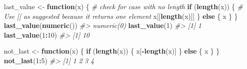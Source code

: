 \documentclass[]{book}
\newenvironment{Shaded}{\begin{snugshade}}{\end{snugshade}}
\newcommand{\CommentTok}[1]{\textcolor[rgb]{0.56,0.35,0.01}{\textit{#1}}}
\newcommand{\ControlFlowTok}[1]{\textcolor[rgb]{0.13,0.29,0.53}{\textbf{#1}}}
\newcommand{\DecValTok}[1]{\textcolor[rgb]{0.00,0.00,0.81}{#1}}
\newcommand{\KeywordTok}[1]{\textcolor[rgb]{0.13,0.29,0.53}{\textbf{#1}}}
\newcommand{\NormalTok}[1]{#1}
\newcommand{\OperatorTok}[1]{\textcolor[rgb]{0.81,0.36,0.00}{\textbf{#1}}}
\newcommand{\StringTok}[1]{\textcolor[rgb]{0.31,0.60,0.02}{#1}}
\theoremstyle{plain}
\theoremstyle{remark}
\theoremstyle{definition}
\theoremstyle{definition}
\theoremstyle{definition}
\theoremstyle{remark}
\begin{document}
\begin{Shaded}
\begin{Highlighting}[]
\NormalTok{last_value <-}\StringTok{ }\ControlFlowTok{function}\NormalTok{(x) \{}
  \CommentTok{# check for case with no length}
  \ControlFlowTok{if}\NormalTok{ (}\KeywordTok{length}\NormalTok{(x)) \{}
    \CommentTok{# Use [[ as suggested because it returns one element}
\NormalTok{    x[[}\KeywordTok{length}\NormalTok{(x)]]  }
\NormalTok{  \} }\ControlFlowTok{else}\NormalTok{ \{}
\NormalTok{    x}
\NormalTok{  \}}
\NormalTok{\}}
\KeywordTok{last_value}\NormalTok{(}\KeywordTok{numeric}\NormalTok{())}
\CommentTok{#> numeric(0)}
\KeywordTok{last_value}\NormalTok{(}\DecValTok{1}\NormalTok{)}
\CommentTok{#> [1] 1}
\KeywordTok{last_value}\NormalTok{(}\DecValTok{1}\OperatorTok{:}\DecValTok{10}\NormalTok{)}
\CommentTok{#> [1] 10}
\end{Highlighting}
\end{Shaded}

\begin{Shaded}
\end{Shaded}

\begin{Shaded}
\begin{Highlighting}[]
\NormalTok{not_last <-}\StringTok{ }\ControlFlowTok{function}\NormalTok{(x) \{}
  \ControlFlowTok{if}\NormalTok{ (}\KeywordTok{length}\NormalTok{(x)) \{}
\NormalTok{    x[}\OperatorTok{-}\KeywordTok{length}\NormalTok{(x)]}
\NormalTok{  \} }\ControlFlowTok{else}\NormalTok{ \{}
\NormalTok{    x}
\NormalTok{  \}}
\NormalTok{\}}
\KeywordTok{not_last}\NormalTok{(}\DecValTok{1}\OperatorTok{:}\DecValTok{5}\NormalTok{)}
\CommentTok{#> [1] 1 2 3 4}
\end{Highlighting}
\end{Shaded}
\end{document}
